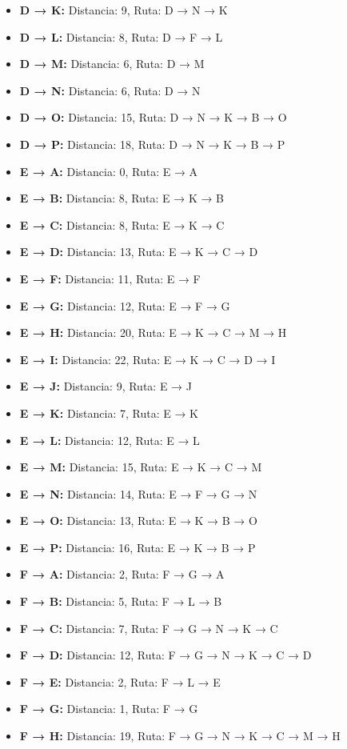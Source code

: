 \documentclass[12pt]{article}
\begin{document}
\begin{itemize}
\item \textbf{D → K:} Distancia: 9, Ruta: D → N → K
\item \textbf{D → L:} Distancia: 8, Ruta: D → F → L
\item \textbf{D → M:} Distancia: 6, Ruta: D → M
\item \textbf{D → N:} Distancia: 6, Ruta: D → N
\item \textbf{D → O:} Distancia: 15, Ruta: D → N → K → B → O
\item \textbf{D → P:} Distancia: 18, Ruta: D → N → K → B → P
\item \textbf{E → A:} Distancia: 0, Ruta: E → A
\item \textbf{E → B:} Distancia: 8, Ruta: E → K → B
\item \textbf{E → C:} Distancia: 8, Ruta: E → K → C
\item \textbf{E → D:} Distancia: 13, Ruta: E → K → C → D
\item \textbf{E → F:} Distancia: 11, Ruta: E → F
\item \textbf{E → G:} Distancia: 12, Ruta: E → F → G
\item \textbf{E → H:} Distancia: 20, Ruta: E → K → C → M → H
\item \textbf{E → I:} Distancia: 22, Ruta: E → K → C → D → I
\item \textbf{E → J:} Distancia: 9, Ruta: E → J
\item \textbf{E → K:} Distancia: 7, Ruta: E → K
\item \textbf{E → L:} Distancia: 12, Ruta: E → L
\item \textbf{E → M:} Distancia: 15, Ruta: E → K → C → M
\item \textbf{E → N:} Distancia: 14, Ruta: E → F → G → N
\item \textbf{E → O:} Distancia: 13, Ruta: E → K → B → O
\item \textbf{E → P:} Distancia: 16, Ruta: E → K → B → P
\item \textbf{F → A:} Distancia: 2, Ruta: F → G → A
\item \textbf{F → B:} Distancia: 5, Ruta: F → L → B
\item \textbf{F → C:} Distancia: 7, Ruta: F → G → N → K → C
\item \textbf{F → D:} Distancia: 12, Ruta: F → G → N → K → C → D
\item \textbf{F → E:} Distancia: 2, Ruta: F → L → E
\item \textbf{F → G:} Distancia: 1, Ruta: F → G
\item \textbf{F → H:} Distancia: 19, Ruta: F → G → N → K → C → M → H

\end{itemize}
\end{document}
